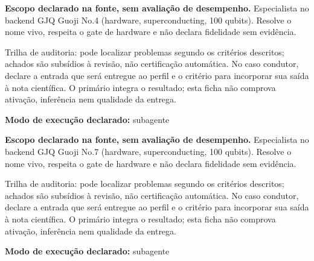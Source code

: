 
\begin{descricao}
\textbf{Escopo declarado na fonte, sem avaliação de desempenho.}
Especialista no backend GJQ Guoji No.4 (hardware, superconducting, 100 qubits). Resolve o nome vivo, respeita o gate de hardware e não declara fidelidade sem evidência.
\end{descricao}

\begin{funcao}
Trilha de auditoria: pode localizar problemas segundo os critérios descritos; achados são subsídios à revisão, não certificação automática. No caso condutor, declare a entrada que será entregue ao perfil e o critério para incorporar sua saída à nota científica. O primário integra o resultado; esta ficha não comprova ativação, inferência nem qualidade da entrega.
\end{funcao}

\begin{arquitetura}
\textbf{Modo de execução declarado:} subagente
\end{arquitetura}


\begin{descricao}
\textbf{Escopo declarado na fonte, sem avaliação de desempenho.}
Especialista no backend GJQ Guoji No.7 (hardware, superconducting, 100 qubits). Resolve o nome vivo, respeita o gate de hardware e não declara fidelidade sem evidência.
\end{descricao}

\begin{funcao}
Trilha de auditoria: pode localizar problemas segundo os critérios descritos; achados são subsídios à revisão, não certificação automática. No caso condutor, declare a entrada que será entregue ao perfil e o critério para incorporar sua saída à nota científica. O primário integra o resultado; esta ficha não comprova ativação, inferência nem qualidade da entrega.
\end{funcao}

\begin{arquitetura}
\textbf{Modo de execução declarado:} subagente
\end{arquitetura}

